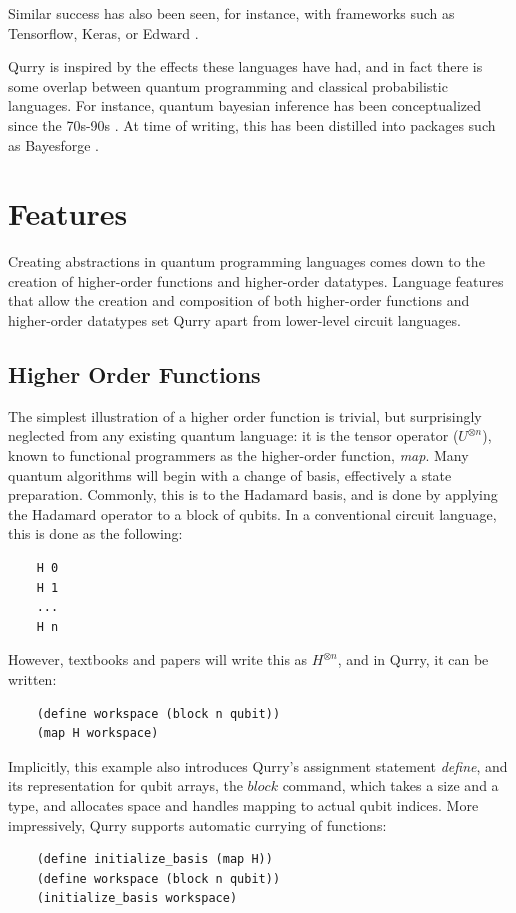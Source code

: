\documentclass[a4paper,twocolumn,11pt,accepted=2017-05-09]{quantumarticle}
\begin{document}
 Similar success has also been seen, for instance, with frameworks such as Tensorflow, Keras, or Edward \cite{abadi2016tensorflow}.

 Qurry is inspired by the effects these languages have had, and in fact there is some overlap between quantum programming and classical probabilistic languages.
 For instance, quantum bayesian inference has been conceptualized since the 70s-90s \cite{tucci1995quantum}.
 At time of writing, this has been distilled into packages such as Bayesforge \cite{bayesforge, przewikezlikowski2019support}.

\section{Features}

    Creating abstractions in quantum programming languages comes down to the creation of higher-order functions and higher-order datatypes.
    Language features that allow the creation and composition of both higher-order functions and higher-order datatypes set Qurry apart from lower-level circuit languages.

    \subsection{Higher Order Functions}

    The simplest illustration of a higher order function is trivial, but surprisingly neglected from any existing quantum language: it is the tensor operator ($U^{\otimes n}$), known to functional programmers as the higher-order function, \emph{map}.
    Many quantum algorithms will begin with a change of basis, effectively a state preparation. 
    Commonly, this is to the Hadamard basis, and is done by applying the Hadamard operator to a block of qubits.
    In a conventional circuit language, this is done as the following:
    \begin{lstlisting}
    H 0
    H 1
    ...
    H n\end{lstlisting}
    However, textbooks and papers will write this as $H^{\otimes n}$, and in Qurry, it can be written:
    \begin{lstlisting}
    (define workspace (block n qubit))
    (map H workspace)\end{lstlisting}
    Implicitly, this example also introduces Qurry's assignment statement \emph{define}, and its representation for qubit arrays, the $block$ command, which takes a size and a type, and allocates space and handles mapping to actual qubit indices.
    More impressively, Qurry supports automatic currying of functions:
    \begin{lstlisting}
    (define initialize_basis (map H))
    (define workspace (block n qubit))
    (initialize_basis workspace)\end{lstlisting}
\end{document}
